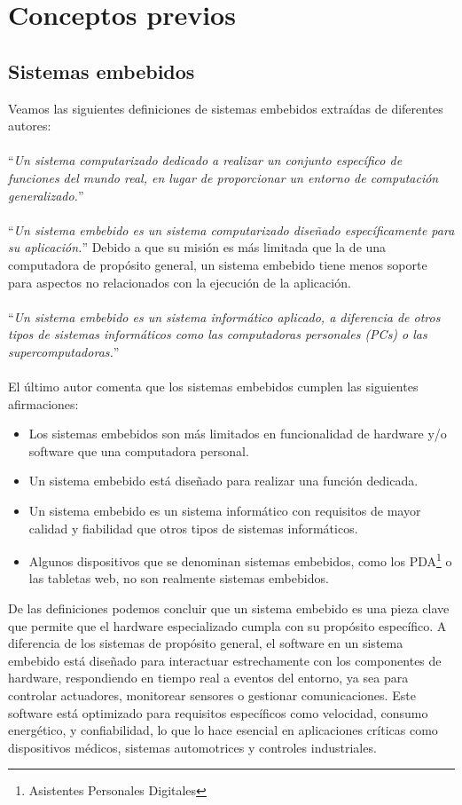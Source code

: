 \chapter{Conceptos previos}

\section{Sistemas embebidos}
Veamos las siguientes definiciones de sistemas embebidos extraídas de diferentes autores:
\\\\
\noindent
``\textit{Un sistema computarizado dedicado a realizar un conjunto específico de funciones del mundo real, en lugar de proporcionar un entorno de computación generalizado.}''~\cite{douglass}
\\\\
\noindent
``\textit{Un sistema embebido es un sistema computarizado diseñado específicamente para su aplicación.}'' Debido a que su misión es más limitada que la de una computadora de propósito general, un sistema embebido tiene menos soporte para aspectos no relacionados con la ejecución de la aplicación.~\cite{elecia}
\\\\
\noindent
``\textit{Un sistema embebido es un sistema informático aplicado, a diferencia de otros tipos de sistemas informáticos como las computadoras personales (PCs) o las supercomputadoras.}''~\cite{noergaard2005embedded}
\\\\
\noindent		
El último autor comenta que los sistemas embebidos cumplen las siguientes afirmaciones:
\begin{itemize}
	\item Los sistemas embebidos son más limitados en funcionalidad de hardware y/o software que una computadora personal.
	\item Un sistema embebido está diseñado para realizar una función dedicada.
	\item Un sistema embebido es un sistema informático con requisitos de mayor calidad y fiabilidad que otros tipos de sistemas informáticos.
	\item Algunos dispositivos que se denominan sistemas embebidos, como los PDA\footnote{Asistentes Personales Digitales} o las tabletas web, no son realmente sistemas embebidos.
\end{itemize}

De las definiciones podemos concluir que un sistema embebido es una pieza clave que permite que el hardware especializado cumpla con su propósito específico. A diferencia de los sistemas de propósito general, el software en un sistema embebido está diseñado para interactuar estrechamente con los componentes de hardware, respondiendo en tiempo real a eventos del entorno, ya sea para controlar actuadores, monitorear sensores o gestionar comunicaciones. Este software está optimizado para requisitos específicos como velocidad, consumo energético, y confiabilidad, lo que lo hace esencial en aplicaciones críticas como dispositivos médicos, sistemas automotrices y controles industriales.
	
